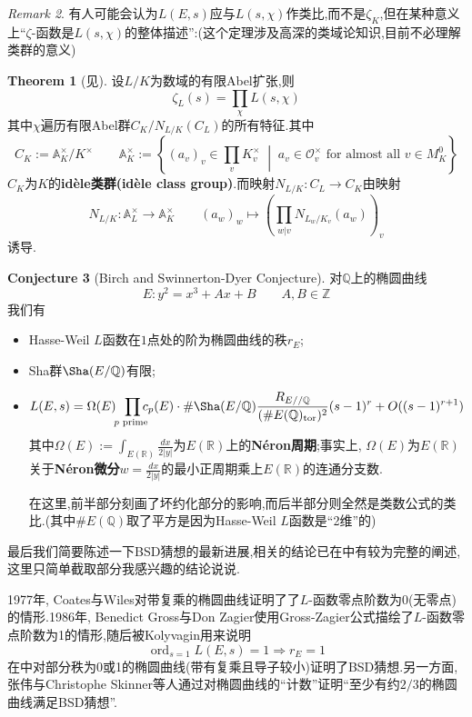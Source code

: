 \documentclass[12pt,A4paper,oneside,reqno]{amsart}
\numberwithin{equation}{section}
\theoremstyle{definition}
\newtheorem{theorem}{Theorem}[section]
\newtheorem{conj}[theorem]{Conjecture}
\theoremstyle{plain}
\theoremstyle{plain}
\numberwithin{equation}{section}
\theoremstyle{remark}
\newtheorem{remark}[theorem]{Remark}
\DeclareMathOperator{\tor}{\operatorname{tor}}
\newcommand{\ord}{\operatorname{ord}}
\begin{document}
\begin{remark}
	有人可能会认为$L(E,s)$应与$L(s, \chi)$作类比,而不是$\zeta_K$,但在某种意义上“$\zeta$-函数是$L(s,\chi)$的整体描述”:(这个定理涉及高深的类域论知识,目前不必理解类群的意义)
	\begin{theorem}[见{\cite[p248, 定理8.15]{fermat2013dream}}]
		设$L/K$为数域的有限Abel扩张,则
		$$\zeta_L(s)=\prod_{\chi}L(s,\chi)$$
		其中$\chi$遍历有限Abel群$C_K/N_{L/K}(C_L)$的所有特征.其中
		$$C_K:=\mathbb{A}_K^{\times}/K^{\times} \qquad \mathbb{A}_K^{\times}:= \left\{(a_v)_v \in \prod_{v} K_v^{\times}\;\middle|\; a_v \in \mathcal{O}_v^{\times} \text{ for almost all } v \in M_K^0 \right\}$$
		$C_K$为$K$的\textbf{id\`{e}le类群(id\`{e}le class group)}.而映射$N_{L/K}:C_L \longrightarrow C_K$由映射
		$$N_{L/K}: \mathbb{A}_L^{\times} \longrightarrow \mathbb{A}_K^{\times} \qquad (a_w)_w \longmapsto \left(\prod_{w|v} N_{L_w/K_v}(a_w)\right)_v$$
		诱导.
	\end{theorem}
\end{remark}
\begin{conj}[Birch and Swinnerton-Dyer Conjecture]对$\mathbb{Q}$上的椭圆曲线$$E:y^2=x^3+Ax+B \qquad A,B \in \mathbb{Z}$$
	我们有
	\begin{itemize}
			\item Hasse-Weil $L$函数在$1$点处的阶为椭圆曲线的秩$r_E$;
		\item Sha群$\Sha(E/\mathbb{Q})$有限;
		\item $$L(E,s)=\Omega(E)\!\! \prod_{p \text{ prime }}\hspace{-3mm}c_p(E)\cdot \#\Sha(E/\mathbb{Q})\frac{R_{E//\mathbb{Q}}}{(\#E(\mathbb{Q})_{\tor})^2} (s-1)^r+O((s-1)^{r+1})$$
		其中$\Omega(E):=\int_{E(\mathbb{R})} \frac{dx}{2|y|}$为$E(\mathbb{R})$上的\textbf{N\'{e}ron周期};事实上, $\Omega(E)$为$E(\mathbb{R})$关于\textbf{N\'{e}ron微分}$w=\frac{dx}{2|y|}$的最小正周期乘上$E(\mathbb{R})$的连通分支数.
		
		在这里,前半部分刻画了坏约化部分的影响,而后半部分则全然是类数公式的类比.(其中$\#E(\mathbb{Q})$取了平方是因为Hasse-Weil $L$函数是“2维”的)
	\end{itemize}
\end{conj}
最后我们简要陈述一下BSD猜想的最新进展,相关的结论已在\cite{zhang2013birch}中有较为完整的阐述,这里只简单截取部分我感兴趣的结论说说.

1977年, Coates与Wiles对带复乘的椭圆曲线证明了了$L$-函数零点阶数为0(无零点)的情形.1986年, Benedict Gross与Don Zagier使用Gross-Zagier公式描绘了$L$-函数零点阶数为1的情形,随后被Kolyvagin用来说明
$$\ord_{s=1}L(E,s)=1 \Longrightarrow r_E=1$$
在\cite{miller2011proving}中对部分秩为0或1的椭圆曲线(带有复乘且导子较小)证明了BSD猜想.另一方面,张伟与Christophe  Skinner等人通过对椭圆曲线的“计数”证明“至少有约$2/3$的椭圆曲线满足BSD猜想”.
\end{document}
